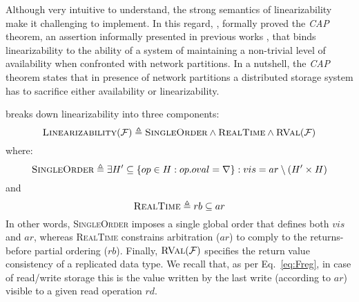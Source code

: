 \documentclass[letter, 11pt]{article}
\newcommand{\RVAL}{\textsc{RVal}(\mathcal{F})}
\newcommand{\citeN}{\citet}
\renewcommand{\cite}{\citep}
\begin{document}
Although very intuitive to understand, the strong semantics of linearizability make it challenging to implement. 
In this regard, \citeN{Gilbert.Lynch:02}, formally proved the \emph{CAP} theorem, an assertion informally presented in previous works \cite{RFC0677,Davidson.Garcia-Molina.ea:85,Coan.ea:86,Brewer:00}, that binds linearizability to the ability of a system of maintaining a non-trivial level of availability when confronted with network partitions.
In a nutshell, the \emph{CAP} theorem states that in presence of network partitions a distributed storage system has to sacrifice either availability or linearizability.

\citeN{Burckhardt:14} breaks down linearizability into three components:
\begin{equation}
\textsc{Linearizability}(\mathcal{F}) \triangleq \textsc{SingleOrder} \wedge \textsc{RealTime} \wedge \RVAL \end{equation}
where:
\begin{equation}
\label{eq:singleorder}
\textsc{SingleOrder} \triangleq \exists H' \subseteq \{op \in H : op.oval = \nabla\}: vis = ar \setminus(H' \times H)
\end{equation}
and
\begin{equation}
\label{eq:realtime}
\textsc{RealTime} \triangleq rb \subseteq ar
\end{equation}
In other words, \textsc{SingleOrder} imposes a single global order that defines both $vis$ and $ar$,
whereas \textsc{RealTime} constrains arbitration ($ar$) to comply to the returns-before partial ordering ($rb$). Finally, $\RVAL$ specifies the return value consistency of a replicated data type. We recall that, as per Eq.~\ref{eq:Freg}, in case of read/write storage this is the value written by the last write (according to $ar$) visible to a given read operation $rd$. 
\end{document}
